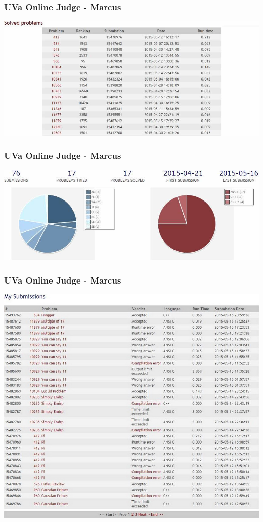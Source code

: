 \documentclass{beamer}
\begin{document}
			\begin{frame}
				\frametitle{UVa Online Judge - Marcus}
				\begin{center}
					\includegraphics[scale=0.38]{Solved2} 
				\end{center}
			\end{frame}

			\begin{frame}
				\frametitle{UVa Online Judge - Marcus}
				\begin{center}
					\includegraphics[scale=0.38]{Statistics2} 
				\end{center}
			\end{frame}

			\begin{frame}
				\frametitle{UVa Online Judge - Marcus}
				\begin{center}
					\includegraphics[scale=0.30]{Submission2-1} 
				\end{center}
			\end{frame}
\end{document}

